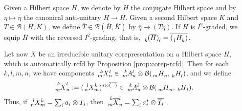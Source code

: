 Given a Hilbert space $H$, we denote by $\overline{H}$ the conjugate Hilbert space and by $\eta\mapsto \overline{\eta}$ the canonical anti-unitary $H\to\overline{H}$. Given a second Hilbert space $K$ and $T \in \mathcal{B}(H,K)$, we define $\overline{T}\in
\mathcal{B}(\overline{H},\overline{K})$ by $\overline{\eta} \mapsto \overline{(T\eta)}$.  If $H$ is $I^{2}$-graded, we equip $\overline{H}$ with the reversed $I^{2}$-grading, that is, $\Grd{(\overline{H})}{k}{l}=\overline{(\Grd{H}{l}{k})}$.

Let now $X$ be an irreducible unitary corepresentation on a Hilbert space $H$, which is automatically rcfd by Proposition \ref{prop:corep-rcfd}. Then for each $k,l,m,n$, we have components $\Gr{X}{k}{l}{m}{n} \in \Gr{A}{k}{l}{m}{n}\otimes \mathcal{B}(\Grd{H}{m}{n},\Grd{H}{k}{l})$, and we
define
\begin{align*}
  \Gr{\overline{X}}{k}{l}{m}{n} &:=  (\Gr{X}{l}{k}{n}{m})^{*\otimes \overline{(\phantom{T})}} \in
  \Gr{A}{k}{l}{m}{n} \otimes \mathcal{B}(\Grd{\overline{H}}{m}{n},\Grd{\overline{H}}{k}{l}).
\end{align*}
Thus, if $ \Gr{X}{l}{k}{n}{m} = \sum_{i} a_{i} \otimes T_{i}$, then $ \Gr{\overline{X}}{k}{l}{m}{n}
= \sum_{i} a_{i}^{*} \otimes \overline{T_{i}}$.

